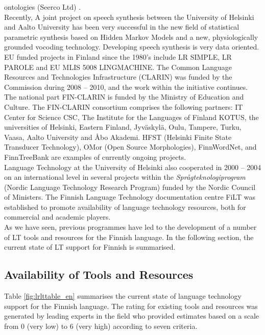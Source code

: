 \begin{multicols}{2}
ontologies (Seerco Ltd) \cite{FinalFENIX}.\\
Recently, A joint project on speech synthesis between the University of
Helsinki and Aalto University has been very successful in the new field of
statistical parametric synthesis based on Hidden Markov Models and a new,
physiologically grounded vocoding technology. Developing speech synthesis is
very data oriented.\\
EU funded projects in Finland since the 1980’s include LR SIMPLE, LR
PAROLE and EU MLIS 5008 LINGMACHINE.  The Common Language Resources
and Technologies Infrastructure (CLARIN) was funded by the Commission
during 2008 – 2010, and the work within the initiative continues. The
national part FIN-CLARIN is funded by the Ministry of Education and
Culture. The FIN-CLARIN consortium comprises the following partners:
IT Center for Science CSC, The Institute for the Languages of
Finland KOTUS, the universities of Helsinki, Eastern Finland,
Jyväskylä, Oulu, Tampere, Turku, Vaasa, Aalto University and Åbo
Akademi. HFST (Helsinki Finite State Transducer Technology), OMor
(Open Source Morphologies), FinnWordNet, and FinnTreeBank are examples
of currently ongoing projects.\\
Language Technology at the University of Helsinki also cooperated in 2000 –
2004 on an international level in several projects within the
\textit{Språgteknologiprogram} (Nordic Language Technology Research Program)
funded by
the Nordic Council of Ministers. The Finnish Language Technology documentation
centre FiLT was established to promote availability of language technology
resources, both for commercial and academic players.\\
As we have seen, previous programmes have led to the development of a number of
LT tools and resources for the Finnish language. In the following section, the
current state of LT support for Finnish is summarised.

\subsection{Availability of Tools and Resources}

Table \ref{fig:lrlttable_en} summarises the current state of language
technology support for the Finnish language. The rating for existing
tools and resources was generated by leading experts in the field who
provided estimates based on a scale from 0 (very low) to 6 (very high)
according to seven criteria.


\end{multicols}
